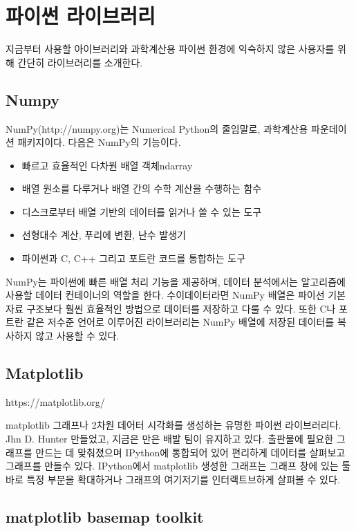 \section{파이썬 라이브러리}

지금부터 사용할 아이브러리와 과학계산용 파이썬 환경에 익숙하지 않은 사용자를 위해 간단히 라이브러리를 소개한다.

\subsection{Numpy}

NumPy(http://numpy.org)는 Numerical Python의 줄임말로, 과학계산용 파운데이션 패키지이다. 다음은 NumPy의 기능이다.


\begin{itemize}
	\item{빠르고 효율적인 다차원 배열 객체ndarray}
	\item{배열 원소를 다루거나 배열 간의 수학 계산을 수행하는 함수}
	\item{디스크로부터 배열 기반의 데이터를 읽거나 쓸 수 있는 도구}
	\item{선형대수 계산, 푸리에 변환, 난수 발생기}
	\item{파이썬과 C, C++ 그리고 포트란 코드를 통합하는 도구}
\end{itemize}


NumPy는 파이썬에 빠른 배열 처리 기능을 제공하며, 데이터 분석에서는 알고리즘에 사용할 데이터 컨테이너의 역할을 한다. 수이데이터라면 NumPy 배열은 파이선 기본 자료 구조보다 훨씬 효율적인 방법으로 데이터를 저장하고 다룰 수 있다. 또한 C나 포트란 같은 저수준 언어로 이루어진 라이브러리는 NumPy 배열에 저장된 데이터를 복사하지 않고 사용할 수 있다. 


\subsection{Matplotlib}

https://matplotlib.org/

matplotlib \은 그래프나 2차원 데어터 시각화를 생성하는 유명한 파이썬 라이브러리다. Jhn D. Hunter \가 만들었고, 지금은 만은 배발 팀이 유지하고 있다. 출판물에 필요한 그래프를 만드는 데 맞춰졌으며 IPython에 통합되어 있어 편리하게 데이터를 살펴보고 그래프를 만들수 있다. IPython에서 matplotlib \로 생성한 그래프는 그래프 창에 있는 툴바로 특정 부분을 확대하거나 그래프의 여기저기를 인터랙트브하게 살펴볼 수 있다.


\subsection{matplotlib basemap toolkit}

